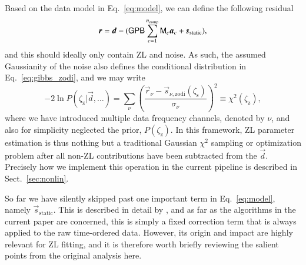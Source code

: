 \documentclass[twocolumn]{aa}
\newcommand{\dv}[0]{\vec{d}}
\newcommand{\B}[0]{\tens{B}}
\newcommand{\G}[0]{\tens{G}}
\newcommand{\s}[0]{\vec{s}}
\renewcommand{\a}[0]{\vec{a}}
\newcommand{\M}[0]{\tens{M}}
\renewcommand{\r}[0]{\vec{r}}
\renewcommand{\P}[0]{\tens{P}}
\begin{document}
Based on the data model in Eq.~\ref{eq:model}, we can define the
following residual
\begin{equation}
\r = \dv - (\G\P\B\sum_{c=1}^{n_{\mathrm{comp}}}\M_c\a_c +
          \s_{\mathrm{static}}),
\end{equation}
and this should ideally only contain ZL and noise. As such, the
assumed Gaussianity of the noise also defines the conditional
distribution in Eq.~\eqref{eq:gibbs_zodi}, and we may write
\begin{equation}
  -2\ln P(\zeta_{\mathrm{z}}|\dv, \ldots) = \sum_{\nu}
  \left(\frac{\r_{\nu} -
    \s_{\nu,\mathrm{zodi}}(\zeta_\mathrm{s})}{\sigma_{\nu}}\right)^2 \equiv
  \chi^2 (\zeta_{\mathrm{z}}),
  \label{eq:gibbs_chisq}
\end{equation}
where we have introduced multiple data frequency channels, denoted by
$\nu$, and also for simplicity neglected the prior,
$P(\zeta_{\mathrm{z}})$. In this framework, ZL parameter estimation is
thus nothing but a traditional Gaussian $\chi^2$ sampling or
optimization problem after all non-ZL contributions have been
subtracted from the $\dv$. Precisely how we implement this operation
in the current pipeline is described in Sect.~\ref{sec:nonlin}.

So far we have silently skipped past one important term in
Eq.~\eqref{eq:model}, namely $\s_{\mathrm{static}}$. This is described
in detail by \citet{CG02_01}, and as far as the algorithms in the
current paper are concerned, this is simply a fixed correction term
that is always applied to the raw time-ordered data. However, its
origin and impact are highly relevant for ZL fitting, and it is
therefore worth briefly reviewing the salient points from the original
analysis here.
\end{document}
